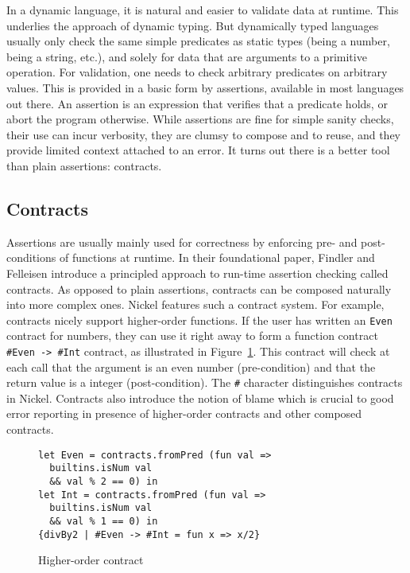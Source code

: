\documentclass[sigplan,10pt,review,anonymous]{acmart}
\newcommand{\nickel}[1]{\lstinline[language=nickel]{#1}}
\begin{document}
In a dynamic language, it is natural and easier to validate data at runtime.
This underlies the approach of dynamic typing. But dynamically typed languages
usually only check the same simple predicates as static types (being a number,
being a string, etc.), and solely for data that are arguments to a primitive
operation. For validation, one needs to check arbitrary predicates on arbitrary
values. This is provided in a basic form by assertions, available in most
languages out there. An assertion is an expression that verifies that a
predicate holds, or abort the program otherwise.  While assertions are fine for
simple sanity checks, their use can incur verbosity, they are clumsy to compose
and to reuse, and they provide limited context attached to an error. It turns
out there is a better tool than plain assertions: contracts.

\subsection*{Contracts}

Assertions are usually mainly used for correctness by enforcing pre- and
post-conditions of functions at runtime. In their foundational
paper\cite{FindlerFelleisenHOContracts}, Findler and Felleisen introduce a
principled approach to run-time assertion checking called contracts. As opposed
to plain assertions, contracts can be composed naturally into more complex ones.
Nickel features such a contract system. For example, contracts nicely support
higher-order functions. If the user has written an \nickel{Even} contract for
numbers, they can use it right away to form a function contract \nickel{#Even ->
#Int} contract, as illustrated in Figure~\ref{fig:contract-higher-order}. This
contract will check at each call that the argument is an even number
(pre-condition) and that the return value is a integer (post-condition). The
\nickel{#} character distinguishes contracts in Nickel. Contracts also introduce
the notion of blame which is crucial to good error reporting in presence of
higher-order contracts and other composed contracts.

\begin{figure}
  \begin{center}
\begin{lstlisting}[language=nickel]
let Even = contracts.fromPred (fun val =>
  builtins.isNum val
  && val % 2 == 0) in
let Int = contracts.fromPred (fun val =>
  builtins.isNum val
  && val % 1 == 0) in
{divBy2 | #Even -> #Int = fun x => x/2}
\end{lstlisting}
  \end{center}
\caption{Higher-order contract}
\label{fig:contract-higher-order}
\end{figure}
\end{document}
